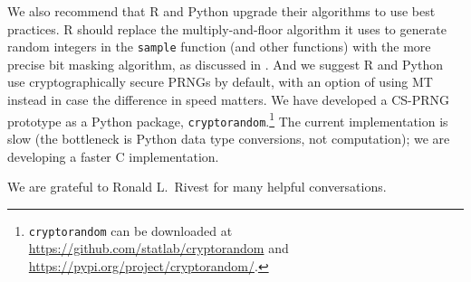 \documentclass[graybox]{svmult}
\begin{document}
We also recommend that R and Python upgrade their algorithms to use best practices.
R should replace the multiply-and-floor algorithm it uses to generate random integers in the \texttt{sample} function (and other functions) with the more precise bit masking algorithm, as discussed
in \cite{ottoboniStark18}.
And we suggest R and Python use cryptographically secure PRNGs by default, with an option of using MT instead in case the difference in speed matters.
We have developed a CS-PRNG prototype as a Python package, \texttt{cryptorandom}.\footnote{ %
\texttt{cryptorandom} can be downloaded at \url{https://github.com/statlab/cryptorandom} and \url{https://pypi.org/project/cryptorandom/}.
} %
The current implementation is slow (the bottleneck is Python data type conversions, not computation);
we are developing a faster C implementation.



\begin{acknowledgement}
We are grateful to Ronald L.~Rivest for many helpful conversations.
\end{acknowledgement}




\end{document}
